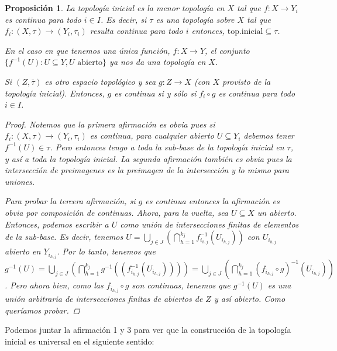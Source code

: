 \documentclass[12pt]{book}
\newtheorem{prop}[teo]{Proposición}
\theoremstyle{definition}
\begin{document}
\begin{prop}
La topología inicial es la menor topología en $X$ tal que $f:X\to Y_i$ es continua para todo $i\in I$. Es decir, si $\tau$ es una topología sobre $X$ tal que $f_i:(X,\tau)\to (Y_i,\tau_i)$ resulta continua para todo $i$ entonces, $\mathrm{top. inicial}\subseteq\tau$.

En el caso en que tenemos una única función, $f:X\to Y$, el conjunto $\{f^{-1}(U) : U\subseteq Y, U\text{ abierto}\}$ ya nos da una topología en $X$.

Si $(Z,\overline{\tau})$ es otro espacio topológico y sea $g:Z\to X$ (con $X$ provisto de la topología inicial). Entonces, $g$ es continua si y sólo si $f_i\circ g$ es continua para todo $i\in I$.
\begin{proof}

Notemos que la primera afirmación es obvia pues si $f_i:(X,\tau)\to (Y_i,\tau_i)$ es continua, para cualquier abierto $U\subseteq Y_i$ debemos tener $f^{-1}(U)\in \tau$. Pero entonces tengo a toda la sub-base de la topología inicial en $\tau$, y así a toda la topología inicial. La segunda afirmación también es obvia pues la intersección de preimagenes es la preimagen de la intersección y lo mismo para uniones.

Para probar la tercera afirmación, si $g$ es continua entonces la afirmación es obvia por composición de continuas. Ahora, para la vuelta, sea $U\subseteq X$ un abierto. Entonces, podemos escribir a $U$ como unión de intersecciones finitas de elementos de la sub-base. Es decir, tenemos  $U=\displaystyle\bigcup_{j\in J}\left(\bigcap_{h=1}^{k_j} f_{i_{h,j}}^{-1}(U_{i_{h,j}})\right)$ con $U_{i_{h,j}}$ abierto en $Y_{i_{h,j}}$. Por lo tanto, tenemos que $g^{-1}(U) = \displaystyle\bigcup_{j\in J} \left( \bigcap_{h=1}^{k_j} g^{-1}((f^{-1}_{i_{h,j}}(U_{i_{h,j}})))\right) = \displaystyle\bigcup_{j\in J} \left( \bigcap_{h=1}^{k_j} (f_{i_{h,j}}\circ g)^{-1}(U_{i_{h,j}})\right)$. Pero ahora bien, como las $f_{i_{h,j}}\circ g$ son continuas, tenemos que $g^{-1}(U)$ es una unión arbitraria de intersecciones finitas de abiertos de $Z$ y así abierto. Como queríamos probar.

\end{proof}
\end{prop}

Podemos juntar la afirmación 1 y 3 para ver que la construcción de la topología inicial es universal en el siguiente sentido:
\end{document}
